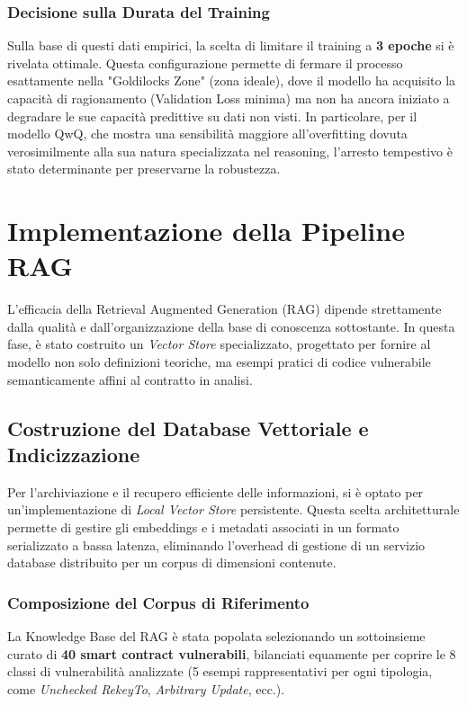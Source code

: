 \subsubsection{Decisione sulla Durata del Training}
Sulla base di questi dati empirici, la scelta di limitare il training a \textbf{3 epoche} si è rivelata ottimale. Questa configurazione permette di fermare il processo esattamente nella "Goldilocks Zone" (zona ideale), dove il modello ha acquisito la capacità di ragionamento (Validation Loss minima) ma non ha ancora iniziato a degradare le sue capacità predittive su dati non visti.
In particolare, per il modello QwQ, che mostra una sensibilità maggiore all'overfitting dovuta verosimilmente alla sua natura specializzata nel reasoning, l'arresto tempestivo è stato determinante per preservarne la robustezza.

\section{Implementazione della Pipeline RAG}
\label{sec:rag_implementation}

L'efficacia della Retrieval Augmented Generation (RAG) dipende strettamente dalla qualità e dall'organizzazione della base di conoscenza sottostante. In questa fase, è stato costruito un \textit{Vector Store} specializzato, progettato per fornire al modello non solo definizioni teoriche, ma esempi pratici di codice vulnerabile semanticamente affini al contratto in analisi.

\subsection{Costruzione del Database Vettoriale e Indicizzazione}
Per l'archiviazione e il recupero efficiente delle informazioni, si è optato per un'implementazione di \textit{Local Vector Store} persistente. Questa scelta architetturale permette di gestire gli embeddings e i metadati associati in un formato serializzato a bassa latenza, eliminando l'overhead di gestione di un servizio database distribuito per un corpus di dimensioni contenute.

\subsubsection{Composizione del Corpus di Riferimento}
La Knowledge Base del RAG è stata popolata selezionando un sottoinsieme curato di \textbf{40 smart contract vulnerabili}, bilanciati equamente per coprire le 8 classi di vulnerabilità analizzate (5 esempi rappresentativi per ogni tipologia, come \textit{Unchecked RekeyTo}, \textit{Arbitrary Update}, ecc.).

